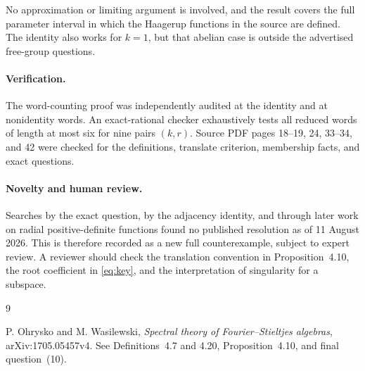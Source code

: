 \documentclass[11pt]{article}
\begin{document}
No approximation or limiting argument is involved, and the result covers
the full parameter interval in which the Haagerup functions in the source
are defined.  The identity also works for $k=1$, but that abelian case is
outside the advertised free-group questions.

\paragraph{Verification.}
The word-counting proof was independently audited at the identity and at
nonidentity words.  An exact-rational checker exhaustively tests all reduced
words of length at most six for nine pairs $(k,r)$.  Source PDF pages 18--19,
24, 33--34, and 42 were checked for the definitions, translate criterion,
membership facts, and exact questions.

\paragraph{Novelty and human review.}
Searches by the exact question, by the adjacency identity, and through later
work on radial positive-definite functions found no published resolution as
of 11 August 2026.  This is therefore recorded as a new full counterexample,
subject to expert review.  A reviewer should check the translation
convention in Proposition~4.10, the root coefficient in \eqref{eq:key}, and
the interpretation of singularity for a subspace.

\begin{thebibliography}{9}
\raggedright
{}
P. Ohrysko and M. Wasilewski,
\emph{Spectral theory of Fourier--Stieltjes algebras},
arXiv:1705.05457v4.  See Definitions~4.7 and 4.20,
Proposition~4.10, and final question~(10).
\end{thebibliography}
\end{document}
